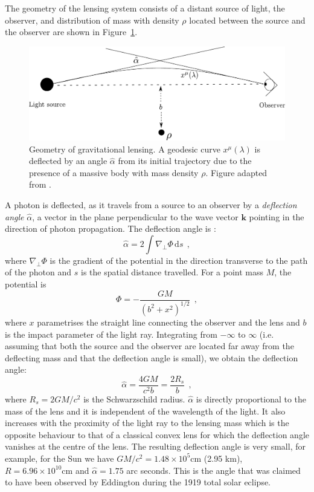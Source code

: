 \documentclass[12pt,dvipsnames]{report}
\newcommand{\ud}{\,\mathrm{d}}
\renewcommand{\vec}[1]{\boldsymbol{\mathbf{#1}}}
\newcommand{\hquad}{~~}
\begin{document}
The geometry of the lensing system consists of a distant source of light, the
observer, and distribution of mass with density $\rho$ located between the
source and the observer are shown in Figure~\ref{fig:deflection_angle}.
\begin{figure}
    \centering
    \includegraphics[width=0.6\linewidth]{../static/microlensing/deflection_angle.pdf}
    \caption{Geometry of gravitational lensing.
        A geodesic curve $x^\mu(\lambda)$ is deflected
        by an angle $\hat\alpha$ from its initial trajectory
        due to the presence of a massive body with mass density $\rho$. Figure
        adapted from \citet{carroll_2019}.}
    \label{fig:deflection_angle}
\end{figure}
A photon is deflected, as it travels from a source to an observer by a
\emph{deflection angle} $\hat\alpha$, a vector in the
plane  perpendicular to the wave vector $\vec{k}$ pointing in the direction of
photon propagation.
The deflection angle is \citep{carroll_2019}:
\begin{equation}
    \hat\alpha=2\int\nabla_\perp\Phi \ud s
    \hquad,
    \label{eq:deflection_angle_general}
\end{equation}
where $\nabla_\perp\Phi$ is the gradient of the potential in the direction transverse
to the path of the photon and $s$ is the spatial distance travelled.
For a point mass $M$, the potential is
\begin{equation}
    \Phi=- \frac{GM}{(b^2+x^2)^{1/2}}
    \hquad,
\end{equation}
where $x$ parametrises the straight line connecting the observer and the lens and
$b$ is the impact parameter of the light ray.
Integrating from $-\infty$ to $\infty$ (i.e. assuming that both
the source and the observer are located far away from the deflecting mass and that the deflection angle 
is small), we obtain
the deflection angle:
\begin{equation}
    \hat\alpha= \frac{4GM}{c^2b}= \frac{2R_s}{b}
    \hquad,
    \label{eq:deflection_angle_point_mass}
\end{equation}
where $R_s=2GM/c^2$ is the Schwarzschild radius.
$\hat\alpha$ is directly proportional to the mass of the lens and
it  is independent of the wavelength of the light. It also increases with the proximity of
the light ray to the lensing mass which is the opposite behaviour to that of a
classical convex lens for which the deflection angle vanishes at the centre of the lens.
The resulting deflection angle is very small, for example, for the Sun we have
$GM/c^2=1.48\times 10^5\si{\centi\meter}$ (2.95 km), $R=6.96\times
    10^{10}\si{\centi\meter}$ and $\hat\alpha=1.75$ arc seconds. This is the angle
that was claimed to have been observed by Eddington during the 1919 total
solar eclipse.
\end{document}
